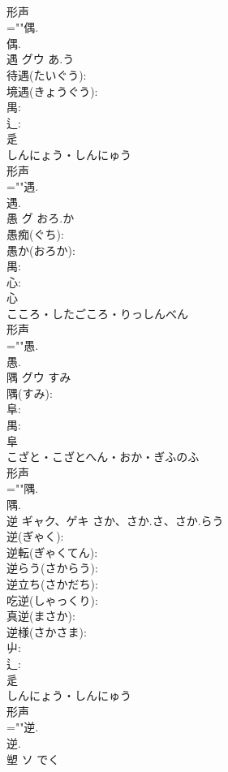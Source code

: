 \documentclass[8pt]{extreport}
\begin{document}
\begin{CJK}{UTF8}{min}
\\	形声 
\\	=""偶.
\\	偶.
\\	遇	グウ	あ.う		
\\	待遇(たいぐう): 
\\	境遇(きょうぐう): 
\\	禺: 
\\	辶: 
\\	辵	
\\	しんにょう・しんにゅう	
\\	形声 
\\	=""遇.
\\	遇.
\\	愚	グ	おろ.か		
\\	愚痴(ぐち): 
\\	愚か(おろか): 
\\	禺: 
\\	心: 
\\	心	
\\	こころ・したごころ・りっしんべん	
\\	形声 
\\	=""愚.
\\	愚.
\\	隅	グウ	すみ		
\\	隅(すみ): 
\\	阜: 
\\	禺: 
\\	阜	
\\	こざと・こざとへん・おか・ぎふのふ	
\\	形声 
\\	=""隅.
\\	隅.
\\	逆	ギャク、ゲキ	さか、さか.さ、さか.らう		
\\	逆(ぎゃく): 
\\	逆転(ぎゃくてん): 
\\	逆らう(さからう): 
\\	逆立ち(さかだち): 
\\	吃逆(しゃっくり): 
\\	真逆(まさか): 
\\	逆様(さかさま): 
\\	屮: 
\\	辶: 
\\	辵	
\\	しんにょう・しんにゅう	
\\	形声 
\\	=""逆.
\\	逆.
\\	塑	ソ	でく		

\end{CJK}
\end{document}
